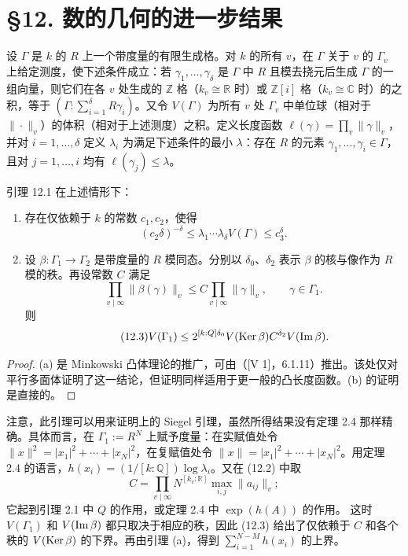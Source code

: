\section*{§12. 数的几何的进一步结果}
设 $\Gamma$ 是 $k$ 的 $R$ 上一个带度量的有限生成格。对 $k$ 的所有 $v$，在 $\Gamma$ 关于 $v$ 的 $\Gamma_v$ 上给定测度，使下述条件成立：若 $\gamma_1,\ldots,\gamma_\delta$ 是 $\Gamma$ 中 $R$ 且模去挠元后生成 $\Gamma$ 的一组向量，则它们在各 $v$ 处生成的 $\mathbb Z$ 格（$k_v\cong\mathbb R$ 时）或 $\mathbb Z[i]$ 格（$k_v\cong\mathbb C$ 时）的之积，等于 $(\Gamma:\sum_{i=1}^\delta R\gamma_i)$。又令 $V(\Gamma)$ 为所有 $v$ 处 $\Gamma_v$ 中单位球（相对于 $\|\cdot\|_v$）的体积（相对于上述测度）之积。定义长度函数 $\ell(\gamma)=\prod_v\|\gamma\|_v$，并对 $i=1,\ldots,\delta$ 定义 $\lambda_i$ 为满足下述条件的最小 $\lambda$：存在 $R$ 的元素 $\gamma_1,\ldots,\gamma_i\in\Gamma$，且对 $j=1,\ldots,i$ 均有 $\ell(\gamma_j)\le\lambda$。
\begin{statement}{引理 12.1}
在上述情形下：
\begin{enumerate}[label=(\alph*).]
\item 存在仅依赖于 $k$ 的常数 $c_1,c_2$，使得
\[
(c_2\delta)^{-\delta}\le\lambda_1\cdots\lambda_\delta V(\Gamma)\le c_3^\delta.
\]
\item 设 $\beta:\Gamma_1\to\Gamma_2$ 是带度量的 $R$ 模同态。分别以 $\delta_0$、$\delta_2$ 表示 $\beta$ 的核与像作为 $R$ 模的秩。再设常数 $C$ 满足
\begin{equation*}\tag{12.2}
\prod_{v\mid\infty}\|\beta(\gamma)\|_v\le C\prod_{v\mid\infty}\|\gamma\|_v,
\qquad\gamma\in\Gamma_1.
\end{equation*}
则
\begin{equation*}\tag{12.3}
V(\Gamma_1)\le2^{[k:Q]\delta_0}V(\operatorname{Ker}\beta)C^{\delta_2}V(\operatorname{Im}\beta).
\end{equation*}
\end{enumerate}
\end{statement}
\begin{proof}
(a) 是 Minkowski 凸体理论的推广，可由（[V 1]，6.1.11）推出。该处仅对平行多面体证明了这一结论，但证明同样适用于更一般的凸长度函数。(b) 的证明是直接的。
\end{proof}
注意，此引理可以用来证明上的 Siegel 引理，虽然所得结果没有定理 2.4 那样精确。具体而言，在 $\Gamma_1:=R^N$ 上赋予度量：在实赋值处令 $\|x\|^2=|x_1|^2+\cdots+|x_N|^2$，在复赋值处令 $\|x\|=|x_1|^2+\cdots+|x_N|^2$。用定理 2.4 的语言，$h(x_i)=(1/[k:\mathbb Q])\log\lambda_i$。又在 (12.2) 中取
\[
C=\prod_{v\mid\infty}N^{[k_v:\mathbb R]}\max_{i,j}\|a_{ij}\|_v;
\]
它起到引理 2.1 中 $Q$ 的作用，或定理 2.4 中 $\exp(h(A))$ 的作用。
这时 $V(\Gamma_1)$ 和 $V(\operatorname{Im}\beta)$ 都只取决于相应的秩，因此 (12.3) 给出了仅依赖于 $C$ 和各个秩的 $V(\operatorname{Ker}\beta)$ 的下界。再由引理 (a)，得到 $\sum_{i=1}^{N-M}h(x_i)$ 的上界。

